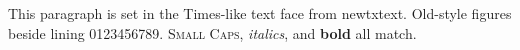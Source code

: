 \documentclass{article}
\begin{document}
This paragraph is set in the Times-like text face from newtxtext.
Old-style figures  beside lining 0123456789.
{\scshape Small Caps}, {\itshape italics}, and {\bfseries bold} all match.
\end{document}
